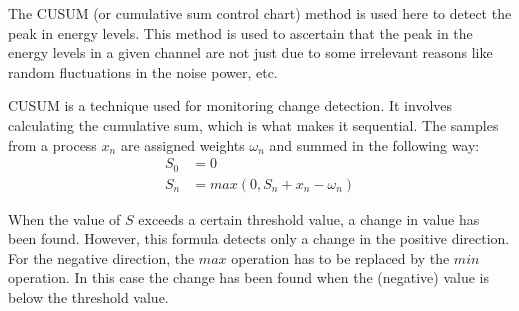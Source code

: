 The CUSUM (or cumulative sum control chart) method is used here to detect 
the peak in energy levels. This method is used to ascertain that the peak in 
the energy levels in a given channel are not just due to some irrelevant 
reasons like random fluctuations in the noise power, etc.
 
CUSUM is a technique used for monitoring change detection. It involves 
calculating the cumulative sum, which is what makes it sequential. The samples
from a process $x_n$ are assigned weights $\omega_n$ and summed in the 
following way:
\begin{align}
    S_0 &= 0 \nonumber \\
    S_n &= max(0, S_n + x_n - \omega_n) \nonumber
\end{align}

When the value of $S$ exceeds a certain threshold value, a change in value has 
been found. However, this formula detects only a change in the positive 
direction. For the negative direction, the $max$ operation has to be replaced 
by the $min$ operation. In this case the change has been found when the 
(negative) value is below the threshold value.





